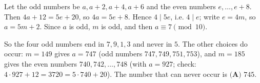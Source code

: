 Let the odd numbers be $a,a+2,a+4,a+6$ and the even numbers $e,\dots,e+8$. Then $4a+12=5e+20$, so $4a=5e+8$. Hence $4\mid5e$, i.e. $4\mid e$; write $e=4m$, so $a=5m+2$. Since $a$ is odd, $m$ is odd, and then $a\equiv7\pmod{10}$.

So the four odd numbers end in $7,9,1,3$ and never in $5$. The other choices do occur: $m=149$ gives $a=747$ (odd numbers $747,749,751,753$), and $m=185$ gives the even numbers $740,742,\dots,748$ (with $a=927$; check: $4\cdot927+12=3720=5\cdot740+20$). The number that can never occur is $\boxed{\textbf{(A) }745}$.
